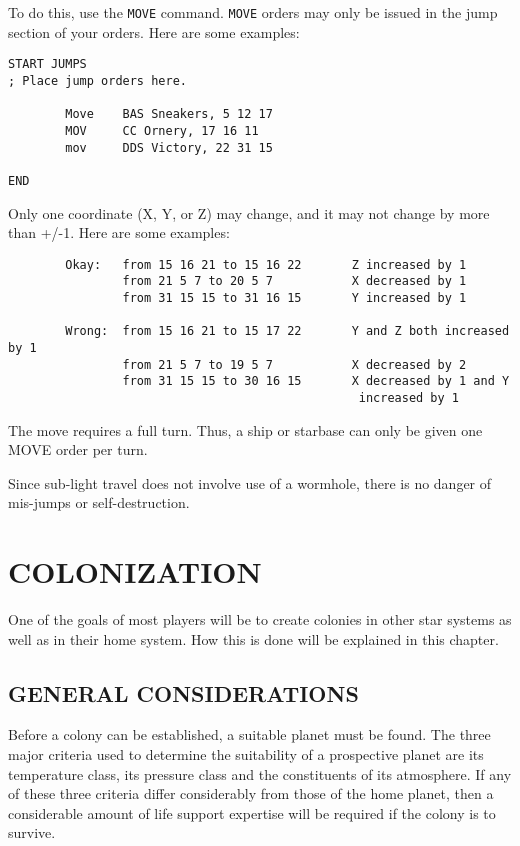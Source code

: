 \documentclass[10pt,titlepage]{article}
\begin{document}
To do this, use the \texttt{MOVE} command.  \texttt{MOVE} orders may only be issued in the
jump section of your orders.  Here are some examples:

\begin{verbatim}
START JUMPS
; Place jump orders here.

        Move    BAS Sneakers, 5 12 17
        MOV     CC Ornery, 17 16 11
        mov     DDS Victory, 22 31 15

END
\end{verbatim} 

Only one coordinate (X, Y, or Z) may change, and it may not change by more than
+/-1.  Here are some examples:

\begin{verbatim}
        Okay:   from 15 16 21 to 15 16 22       Z increased by 1
                from 21 5 7 to 20 5 7           X decreased by 1
                from 31 15 15 to 31 16 15       Y increased by 1

        Wrong:  from 15 16 21 to 15 17 22       Y and Z both increased by 1
                from 21 5 7 to 19 5 7           X decreased by 2
                from 31 15 15 to 30 16 15       X decreased by 1 and Y
                                                 increased by 1
\end{verbatim} 

The move requires a full turn.  Thus, a ship or starbase can only be given one
MOVE order per turn.

Since sub-light travel does not involve use of a wormhole, there is no danger
of mis-jumps or self-destruction.



\section{COLONIZATION}
\label{sec:colonization}

One of the goals of most players will be to create colonies in other star
systems as well as in their home system.  How this is done will be explained
in this chapter.


\subsection{GENERAL CONSIDERATIONS}
\label{sec:generalconsiderations}


Before a colony can be established, a suitable planet must be found.  The
three major criteria used to determine the suitability of a prospective planet
are its temperature class, its pressure class and the constituents of its
atmosphere.  If any of these three criteria differ considerably from those of
the home planet, then a considerable amount of life support expertise will be
required if the colony is to survive.
\end{document}

